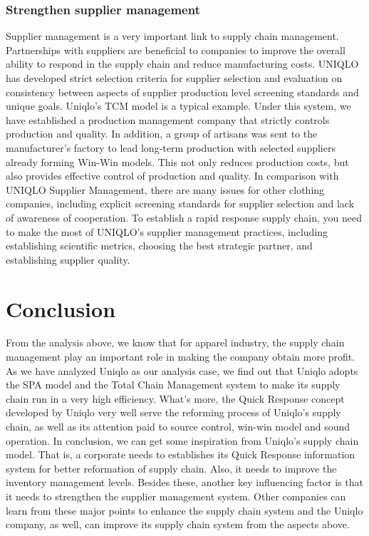 \documentclass[12pt,]{article}
\begin{document}
\hypertarget{strengthen-supplier-management}{%
\subsubsection{Strengthen supplier
management}\label{strengthen-supplier-management}}

Supplier management is a very important link to supply chain management.
Partnerships with suppliers are beneficial to companies to improve the
overall ability to respond in the supply chain and reduce manufacturing
costs. UNIQLO has developed strict selection criteria for supplier
selection and evaluation on consistency between aspects of supplier
production level screening standards and unique goals. Uniqlo's TCM
model is a typical example. Under this system, we have established a
production management company that strictly controls production and
quality. In addition, a group of artisans was sent to the manufacturer's
factory to lead long-term production with selected suppliers already
forming Win-Win models. This not only reduces production costs, but also
provides effective control of production and quality. In comparison with
UNIQLO Supplier Management, there are many issues for other clothing
companies, including explicit screening standards for supplier selection
and lack of awareness of cooperation. To establish a rapid response
supply chain, you need to make the most of UNIQLO's supplier management
practices, including establishing scientific metrics, choosing the best
strategic partner, and establishing supplier quality.

\hypertarget{conclusion}{%
\section{Conclusion}\label{conclusion}}

From the analysis above, we know that for apparel industry, the supply
chain management play an important role in making the company obtain
more profit. As we have analyzed Uniqlo as our analysis case, we find
out that Uniqlo adopts the SPA model and the Total Chain Management
system to make its supply chain run in a very high efficiency. What's
more, the Quick Response concept developed by Uniqlo very well serve the
reforming process of Uniqlo's supply chain, as well as its attention
paid to source control, win-win model and sound operation. In
conclusion, we can get some inspiration from Uniqlo's supply chain
model. That is, a corporate needs to establishes its Quick Response
information system for better reformation of supply chain. Also, it
needs to improve the inventory management levels. Besides these, another
key influencing factor is that it needs to strengthen the supplier
management system. Other companies can learn from these major points to
enhance the supply chain system and the Uniqlo company, as well, can
improve its supply chain system from the aspects above.
\end{document}
